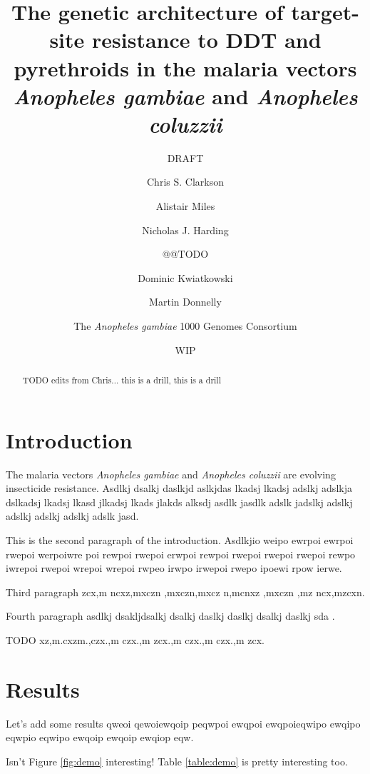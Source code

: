 \documentclass[a4paper,10pt,abstracton]{scrartcl}
\title{
The genetic architecture of target-site resistance to DDT and pyrethroids in the malaria vectors \emph{Anopheles gambiae} and \emph{Anopheles coluzzii}
}
\subtitle{DRAFT}
\date{WIP}
\author[1]{Chris S. Clarkson}
\author[2,1]{Alistair Miles}
\author[2]{Nicholas J. Harding}
\author{@@TODO}
\author[1,2]{Dominic Kwiatkowski}
\author[3,1]{Martin Donnelly}
\author[4]{The \emph{Anopheles gambiae} 1000 Genomes Consortium}
\affil[1]{Sanger @@TODO}
\affil[2]{Oxford @@TODO}
\affil[3]{Liverpool @@TODO}
\affil[4]{MalariaGEN @@TODO}
\begin{document}
\maketitle

\begin{abstract}

TODO edits from Chris...
%
this is a drill, this is a drill

\end{abstract}

\section*{Introduction}

The malaria vectors \emph{Anopheles gambiae} and \emph{Anopheles coluzzii} are evolving insecticide resistance.
%
Asdlkj dsalkj daslkjd aslkjdas lkadsj lkadsj adslkj adslkja dslkadsj lkadsj lkasd jlkadsj lkads jlakds alksdj asdlk jasdlk adslk jadslkj adslkj adslkj adslkj adslkj adslk jasd.

This is the second paragraph of the introduction.
%
Asdlkjio weipo ewrpoi ewrpoi rwepoi werpoiwre poi rewpoi rwepoi erwpoi rewpoi rwepoi rwepoi rwepoi rewpo iwrepoi rwepoi wrepoi wrepoi rwpeo irwpo irwepoi rwepo ipoewi rpow ierwe.

Third paragraph zcx,m ncxz,mxczn ,mxczn,mxcz n,mcnxz ,mxczn ,mz ncx,mzcxn.

Fourth paragraph asdlkj dsakljdsalkj dsalkj daslkj daslkj dsalkj daslkj sda \cite{Garud2015}.

TODO xz,m.cxzm.,czx.,m czx.,m zcx.,m czx.,m czx.,m zcx.

\section*{Results}

Let's add some results qweoi qewoiewqoip peqwpoi ewqpoi ewqpoieqwipo ewqipo eqwpio eqwipo ewqoip ewqoip ewqiop eqw.

Isn't Figure \ref{fig:demo} interesting! 
%
Table \ref{table:demo} is pretty interesting too.

\begin{landscape}
\begin{table}[h]
  \small
  \centering
  
  \caption{
\textbf{Non-synonymous mutations in the voltage-gated sodium channel gene}. 
%
All mutations are at 5\% frequency or above in one or more of the 9 Ag1000G phase 1 populations, with the exception of \texttt{2,400,071 G>T} which is only found in the CM\emph{Ag} population at 0.4\% frequency but is included because another mutation (\texttt{2,400,071 G>A}) is found at the same position causing the same amino acid substitution (\texttt{M490I}). 
%
Substitutions marked with an asterisk (*) failed conservative variant filters applied genome-wide in the Ag1000G phase 1 AR3 callset, but appeared sound on manual inspection of read alignments.
}
  \label{table:variants_missense}
\end{table}
\end{landscape}
\end{document}
